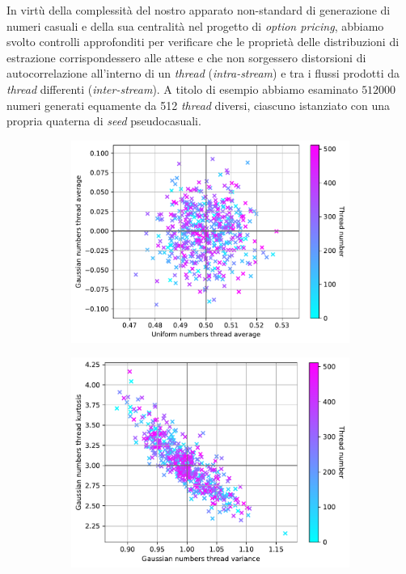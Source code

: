 In virtù della complessità del nostro apparato non-standard di generazione di numeri casuali e della sua centralità nel progetto di \textit{option pricing}, abbiamo svolto controlli approfonditi per verificare che le proprietà delle distribuzioni di estrazione corrispondessero alle attese e che non sorgessero distorsioni di autocorrelazione all'interno di un \textit{thread} (\textit{intra-stream}) e tra i flussi prodotti da \textit{thread} differenti (\textit{inter-stream}). A titolo di esempio abbiamo esaminato $512000$ numeri generati equamente da 512 \textit{thread} diversi, ciascuno istanziato con una propria quaterna di \textit{seed} pseudocasuali.

\begin{figure}[t]
\centering
\begin{subfigure}{.5\textwidth}
  \centering
  \includegraphics[scale=0.5]{graphs/CorrelationTests_UniAvgVsGaussAvg.pdf}
  \caption{}
  \label{fig:unigauss_avg}
\end{subfigure}%
\begin{subfigure}{.5\textwidth}
  \centering
  \includegraphics[scale=0.5]{graphs/CorrelationTests_KurtosisVsVariance.pdf}

\end{subfigure}
\end{figure}
